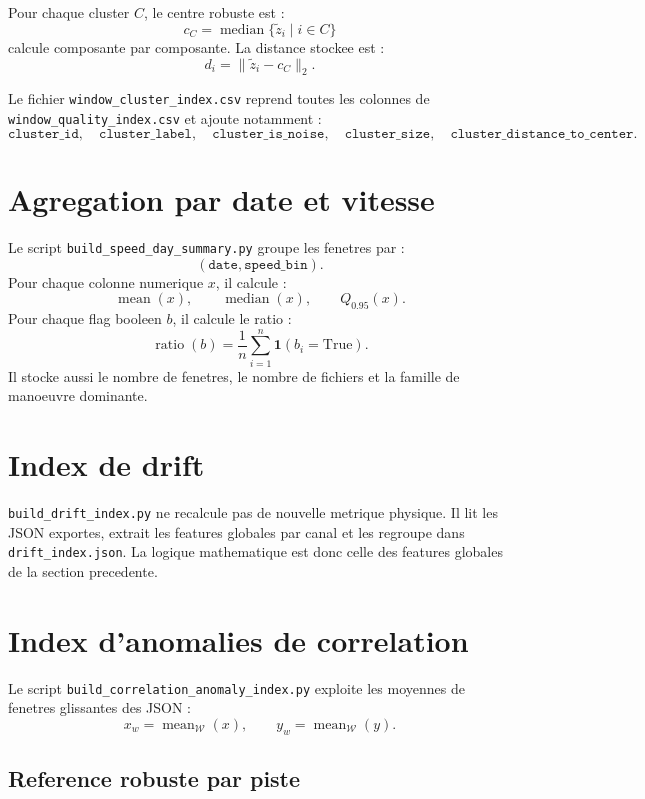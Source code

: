 \documentclass[11pt,a4paper]{article}
\newcommand{\median}{\operatorname{median}}
\begin{document}
Pour chaque cluster $C$, le centre robuste est :
\[
  c_C=\median\{\tilde{z}_i\mid i\in C\}
\]
calcule composante par composante. La distance stockee est :
\[
  d_i=\|\tilde{z}_i-c_C\|_2.
\]

Le fichier \texttt{window\_cluster\_index.csv} reprend toutes les colonnes de \texttt{window\_quality\_index.csv} et ajoute notamment :
\[
  \texttt{cluster\_id},\quad
  \texttt{cluster\_label},\quad
  \texttt{cluster\_is\_noise},\quad
  \texttt{cluster\_size},\quad
  \texttt{cluster\_distance\_to\_center}.
\]

\section{Agregation par date et vitesse}

Le script \texttt{build\_speed\_day\_summary.py} groupe les fenetres par :
\[
  (\texttt{date},\texttt{speed\_bin}).
\]
Pour chaque colonne numerique $x$, il calcule :
\[
  \operatorname{mean}(x),\qquad
  \median(x),\qquad
  Q_{0.95}(x).
\]
Pour chaque flag booleen $b$, il calcule le ratio :
\[
  \operatorname{ratio}(b)=\frac{1}{n}\sum_{i=1}^{n}\mathbf{1}(b_i=\text{True}).
\]
Il stocke aussi le nombre de fenetres, le nombre de fichiers et la famille de manoeuvre dominante.

\section{Index de drift}

\texttt{build\_drift\_index.py} ne recalcule pas de nouvelle metrique physique.
Il lit les JSON exportes, extrait les features globales par canal et les regroupe dans \texttt{drift\_index.json}.
La logique mathematique est donc celle des features globales de la section precedente.

\section{Index d'anomalies de correlation}

Le script \texttt{build\_correlation\_anomaly\_index.py} exploite les moyennes de fenetres glissantes des JSON :
\[
  x_w=\operatorname{mean}_{\mathcal{W}}(x),\qquad
  y_w=\operatorname{mean}_{\mathcal{W}}(y).
\]

\subsection{Reference robuste par piste}
\end{document}
